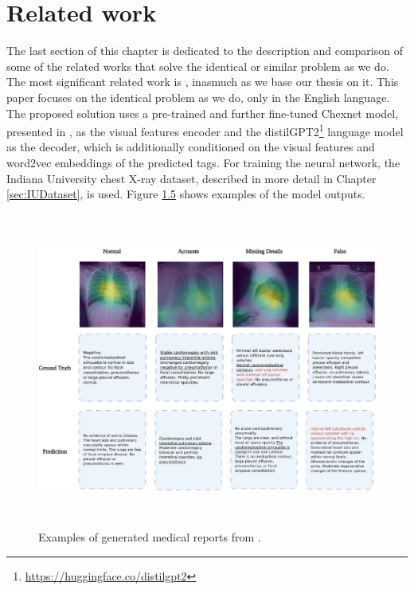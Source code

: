 \section{Related work}
\label{sec:RelatedWork}
The last section of this chapter is dedicated to the description and comparison of some of the related works that solve the identical or similar problem as we do.\\

The most significant related work is \citet{alfarghaly2021automated}, inasmuch as we base our thesis on it. This paper focuses on the identical problem as we do, only in the English language. The proposed solution uses a pre-trained and further fine-tuned Chexnet model, presented in \citet{rajpurkar2017chexnet}, as the visual features encoder and the distilGPT2\footnote[14]{\url{https://huggingface.co/distilgpt2}} language model\citep{sanh2019distilbert} as the decoder, which is additionally conditioned on the visual features and word2vec\citep{mikolov2013distributed} embeddings of the predicted tags. For training the neural network, the Indiana University chest X-ray dataset, described in more detail in Chapter \ref{sec:IUDataset}, is used. Figure \hyperref[fig05:OmarExample]{1.5} shows examples of the model outputs.\\

\begin{figure}[h]\centering
\includegraphics[width=145mm, height=104mm]{../img/OmarExample}
\caption{Examples of generated medical reports from \citet{alfarghaly2021automated}.}
\label{fig05:OmarExample}
\end{figure}

